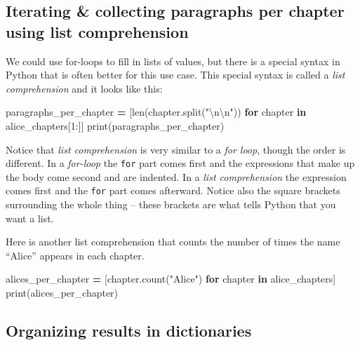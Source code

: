 \documentclass[]{book}
\newenvironment{Shaded}{\begin{snugshade}}{\end{snugshade}}
\newcommand{\KeywordTok}[1]{\textcolor[rgb]{0.13,0.29,0.53}{\textbf{#1}}}
\newcommand{\DecValTok}[1]{\textcolor[rgb]{0.00,0.00,0.81}{#1}}
\newcommand{\CharTok}[1]{\textcolor[rgb]{0.31,0.60,0.02}{#1}}
\newcommand{\StringTok}[1]{\textcolor[rgb]{0.31,0.60,0.02}{#1}}
\newcommand{\ControlFlowTok}[1]{\textcolor[rgb]{0.13,0.29,0.53}{\textbf{#1}}}
\newcommand{\OperatorTok}[1]{\textcolor[rgb]{0.81,0.36,0.00}{\textbf{#1}}}
\newcommand{\BuiltInTok}[1]{#1}
\newcommand{\NormalTok}[1]{#1}
\begin{document}
\subsection{Iterating \& collecting paragraphs per chapter using list
comprehension}\label{iterating-collecting-paragraphs-per-chapter-using-list-comprehension}

We could use for-loops to fill in lists of values, but there is a
special syntax in Python that is often better for this use case. This
special syntax is called a \emph{list comprehension} and it looks like
this:

\begin{Shaded}
\begin{Highlighting}[]
\NormalTok{paragraphs_per_chapter }\OperatorTok{=}\NormalTok{ [}\BuiltInTok{len}\NormalTok{(chapter.split(}\StringTok{"}\CharTok{\textbackslash{}n\textbackslash{}n}\StringTok{"}\NormalTok{)) }
                          \ControlFlowTok{for}\NormalTok{ chapter }\KeywordTok{in}\NormalTok{ alice_chapters[}\DecValTok{1}\NormalTok{:]]}
\BuiltInTok{print}\NormalTok{(paragraphs_per_chapter)}
\end{Highlighting}
\end{Shaded}

Notice that \emph{list comprehension} is very similar to a \emph{for
loop}, though the order is different. In a \emph{for-loop} the
\texttt{for} part comes first and the expressions that make up the body
come second and are indented. In a \emph{list comprehension} the
expression comes first and the \texttt{for} part comes afterward. Notice
also the square brackets surrounding the whole thing -- these brackets
are what tells Python that you want a list.

Here is another list comprehension that counts the number of times the
name ``Alice'' appears in each chapter.

\begin{Shaded}
\begin{Highlighting}[]
\NormalTok{alices_per_chapter }\OperatorTok{=}\NormalTok{ [chapter.count(}\StringTok{"Alice"}\NormalTok{) }\ControlFlowTok{for}\NormalTok{ chapter }\KeywordTok{in}\NormalTok{ alice_chapters]}
\BuiltInTok{print}\NormalTok{(alices_per_chapter)}
\end{Highlighting}
\end{Shaded}

\subsection{Organizing results in
dictionaries}\label{organizing-results-in-dictionaries}
\end{document}
